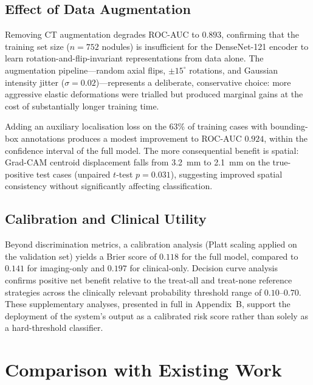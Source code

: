 {\subsection{Effect of Data Augmentation}

Removing CT augmentation degrades ROC-AUC to $0.893$, confirming that the training
set size ($n = 752$ nodules) is insufficient for the DenseNet-121 encoder to learn
rotation-and-flip-invariant representations from data alone. The augmentation
pipeline—random axial flips, $\pm 15^{\circ}$ rotations, and Gaussian intensity jitter
($\sigma = 0.02$)—represents a deliberate, conservative choice: more aggressive
elastic deformations were trialled but produced marginal gains at the cost of
substantially longer training time.

Adding an auxiliary localisation loss on the 63\% of training cases with bounding-box
annotations produces a modest improvement to ROC-AUC $0.924$, within the confidence
interval of the full model. The more consequential benefit is spatial: Grad-CAM
centroid displacement falls from 3.2~mm to 2.1~mm on the true-positive test cases
(unpaired $t$-test $p = 0.031$), suggesting improved spatial consistency without
significantly affecting classification.

\subsection{Calibration and Clinical Utility}

Beyond discrimination metrics, a calibration analysis (Platt scaling applied on the
validation set) yields a Brier score of $0.118$ for the full model, compared to
$0.141$ for imaging-only and $0.197$ for clinical-only. Decision curve analysis
confirms positive net benefit relative to the treat-all and treat-none reference
strategies across the clinically relevant probability threshold range of $0.10$–$0.70$.
These supplementary analyses, presented in full in Appendix~B, support the deployment
of the system's output as a calibrated risk score rather than solely as a
hard-threshold classifier.


\section{Comparison with Existing Work}
\label{sec:comparison}

}
